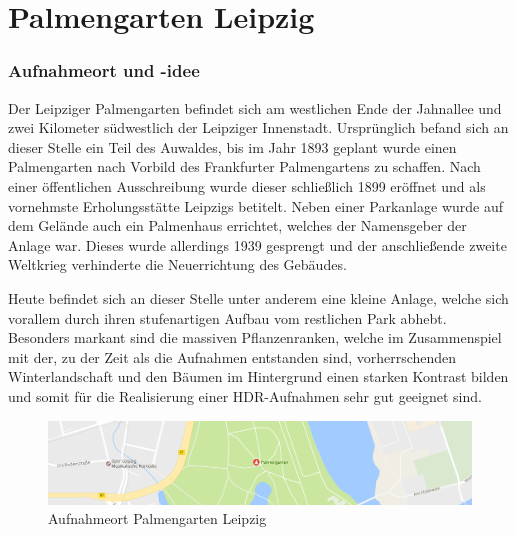 \documentclass[liststotoc,bibtotoc,fontsize=14pt,]{scrreprt}
\begin{document}
\section{Palmengarten Leipzig}
\label{sec:palme}
\subsubsection{Aufnahmeort und -idee}
Der Leipziger Palmengarten befindet sich am westlichen Ende der Jahnallee und zwei Kilometer südwestlich der Leipziger Innenstadt. Ursprünglich befand sich an dieser Stelle ein Teil des Auwaldes, bis im Jahr 1893 geplant wurde einen Palmengarten nach Vorbild des Frankfurter Palmengartens zu schaffen. Nach einer öffentlichen Ausschreibung wurde dieser schließlich 1899 eröffnet und als vornehmste Erholungsstätte Leipzigs betitelt. Neben einer Parkanlage wurde auf dem Gelände auch ein Palmenhaus errichtet, welches der Namensgeber der Anlage war. Dieses wurde allerdings 1939 gesprengt und der anschließende zweite Weltkrieg verhinderte die Neuerrichtung des Gebäudes. 

\bigskip
Heute befindet sich an dieser Stelle unter anderem eine kleine Anlage, welche sich vorallem durch ihren stufenartigen Aufbau vom restlichen Park abhebt. Besonders markant sind die massiven Pflanzenranken, welche im Zusammenspiel mit der, zu der Zeit als die Aufnahmen entstanden sind, vorherrschenden Winterlandschaft und den Bäumen im Hintergrund einen starken Kontrast bilden und somit für die Realisierung einer HDR-Aufnahmen sehr gut geeignet sind. 

\begin{figure}[H]
	\includegraphics[width=\linewidth]{img/places/palmen_map.jpg}
	\caption{Aufnahmeort Palmengarten Leipzig}
	\label{img:ak_map}
\end{figure}
\end{document}
